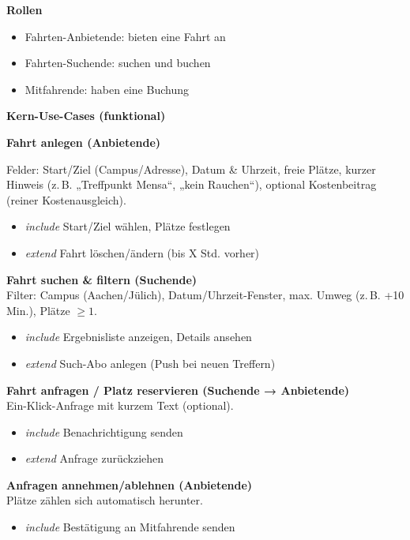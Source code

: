\documentclass[12pt]{article}
\begin{document}
\textbf{Rollen}

\begin{itemize}
  \item Fahrten-Anbietende: bieten eine Fahrt an
  \item Fahrten-Suchende: suchen und buchen
  \item Mitfahrende: haben eine Buchung
\end{itemize}

\textbf{Kern-Use-Cases (funktional)}

\textbf{Fahrt anlegen (Anbietende)}

Felder: Start/Ziel (Campus/Adresse), Datum \& Uhrzeit, freie Plätze, kurzer Hinweis (z.\,B. „Treffpunkt Mensa“, „kein Rauchen“), optional Kostenbeitrag (reiner Kostenausgleich).

\begin{itemize}
  \item \textit{include} Start/Ziel wählen, Plätze festlegen
  \item \textit{extend} Fahrt löschen/ändern (bis X Std. vorher)
\end{itemize}

\textbf{Fahrt suchen \& filtern (Suchende)}\\
Filter: Campus (Aachen/Jülich), Datum/Uhrzeit-Fenster, max. Umweg (z.\,B. +10 Min.), Plätze $\geq 1$.

\begin{itemize}
  \item \textit{include} Ergebnisliste anzeigen, Details ansehen
  \item \textit{extend} Such-Abo anlegen (Push bei neuen Treffern)
\end{itemize}

\textbf{Fahrt anfragen / Platz reservieren (Suchende → Anbietende)}\\
Ein-Klick-Anfrage mit kurzem Text (optional).

\begin{itemize}
  \item \textit{include} Benachrichtigung senden
  \item \textit{extend} Anfrage zurückziehen
\end{itemize}

\textbf{Anfragen annehmen/ablehnen (Anbietende)}\\
Plätze zählen sich automatisch herunter.

\begin{itemize}
  \item \textit{include} Bestätigung an Mitfahrende senden
\end{itemize}
\end{document}
